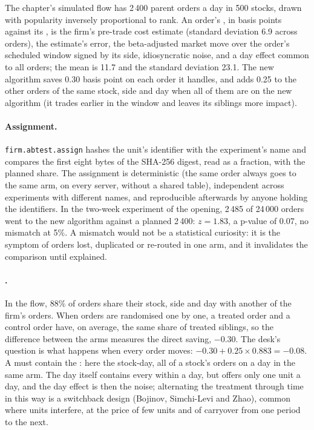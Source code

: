 The chapter's simulated flow has 2\,400 parent orders a day in 500 stocks, drawn with popularity inversely proportional to rank. An order's , in basis points against its , is the firm's pre-trade cost estimate (standard deviation 6.9 across orders), the estimate's error,
the beta-adjusted market move over the order's scheduled window signed by its side, idiosyncratic noise, and a day effect common to all orders; the mean is
11.7 and the standard deviation 23.1. The new algorithm saves 0.30 basis point on each order it handles, and adds 0.25 to the other orders of the same stock,
side and day when all of them are on the new algorithm (it trades earlier in the window and leaves its siblings more impact).

\paragraph{Assignment.} \texttt{firm.abtest.assign} hashes the unit's identifier with the experiment's name and compares the first eight bytes of the SHA-256
digest, read as a fraction, with the planned share. The assignment is deterministic (the same order always goes to the same arm, on every server, without a
shared table), independent across experiments with different names, and reproducible afterwards by anyone holding the identifiers. In the two-week
experiment of the opening, 2\,485 of 24\,000 orders went to the new algorithm against a planned 2\,400: $z = 1.83$, a p-value of 0.07, no mismatch at 5\%. A
mismatch would not be a statistical curiosity: it is the symptom of orders lost, duplicated or re-routed in one arm, and it invalidates the comparison until
explained.

\paragraph{.} In the flow, 88\% of orders share their stock, side and day with another of the firm's orders. When orders are randomised one by
one, a treated order and a control order have, on average, the same share of treated siblings, so the difference between the arms measures the direct
saving, $-0.30$. The desk's question is what happens when every order moves: $-0.30 + 0.25 \times 0.883 = -0.08$. A  must contain the
: here the stock-day, all of a stock's orders on a day in the same arm. The day itself contains every  within a day, but offers
only one unit a day, and the day effect is then the noise; alternating the treatment through time in this way is a switchback design (Bojinov, Simchi-Levi
and Zhao), common where units interfere, at the price of few units and of carryover from one period to the next.

